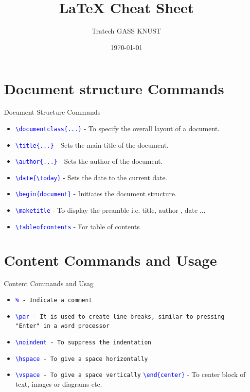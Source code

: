 \documentclass{beamer}
\title{LaTeX Cheat Sheet}
\author{Tratech GASS KNUST}
\date{\today}
\begin{document}
	\newcommand{\imgHeight}{100pt}
	\newcommand{\imgWidth}{100pt}
	
	\begin{frame}
		\titlepage
	\end{frame}
	
	\begin{frame}
		\tableofcontents
	\end{frame}
	
	\section{Document structure Commands}
	\begin{frame}{ Document Structure Commands}
		\begin{itemize}
			\item \texttt{\textcolor{blue}{\textbackslash documentclass\{...\}}} - To specify the overall layout of a document.
			\item \texttt{\textcolor{blue}{\textbackslash title\{...\}}} - Sets the main title of the document.
			\item \texttt{\textcolor{blue}{\textbackslash author\{...\}}} - Sets the author of the document.
			\item \texttt{\textcolor{blue}{\textbackslash date\{\textbackslash today\}}} - Sets the date to the current date.
			\item \texttt{\textcolor{blue}{\textbackslash begin\{document\}}} - Initiates the document structure.
			\item \texttt{\textcolor{blue}{\textbackslash maketitle}} - To display the preamble i.e. title, author , date ...
			\item \texttt{\textcolor{blue}{\textbackslash tableofcontents}} - For table of contents
		\end{itemize}
		
	\end{frame}
	
	\section{Content Commands and Usage}
	\begin{frame}{ Content Commands and Usag}
		\begin{itemize}
			\item \texttt{\textcolor{blue}{\%} - Indicate a comment}
			\item \texttt{\textcolor{blue}{\textbackslash par} -  It is used to create line breaks, similar to pressing "Enter" in a word processor}
			\item \texttt{\textcolor{blue}{\textbackslash noindent} - To suppress the indentation}
			\item \texttt{\textcolor{blue}{\textbackslash hspace} - To give a space horizontally}
			\item \texttt{\textcolor{blue}{\textbackslash vspace} - To give a space vertically}
			\texttt{\textcolor{blue}{\textbackslash end\{center\}}} - To center block of text, images or diagrams etc.
		\end{itemize}
	\end{frame}
\end{document}
